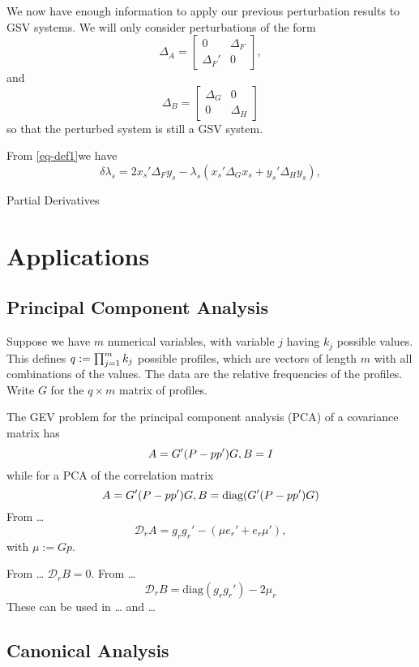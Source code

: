 \documentclass[
  12pt,
  letterpaper,
  DIV=11,
  numbers=noendperiod]{scrartcl}
\begin{document}
We now have enough information to apply our previous perturbation
results to GSV systems. We will only consider perturbations of the form
\[
\Delta_A=\begin{bmatrix}
0&\Delta_F\\
\Delta_F'&0
\end{bmatrix},
\] and \[
\Delta_B=\begin{bmatrix}
\Delta_G&0\\
0&\Delta_H
\end{bmatrix}
\] so that the perturbed system is still a GSV system.

From \eqref{eq-def1}we have \[
\delta\lambda_s=2x_s'\Delta_Fy_s-\lambda_s(x_s'\Delta_Gx_s+y_s'\Delta_Hy_s),
\]

Partial Derivatives

\section{Applications}\label{sec-applications}

\subsection{Principal Component Analysis}\label{sec-pca}

Suppose we have \(m\) numerical variables, with variable \(j\) having
\(k_j\) possible values. This defines \(q:=\smash{\prod_{j=1}^m k_j}\)
possible profiles, which are vectors of length \(m\) with all
combinations of the values. The data are the relative frequencies of the
profiles. Write \(G\) for the \(q\times m\) matrix of profiles.

The GEV problem for the principal component analysis (PCA) of a
covariance matrix has \[
A=G'(P-pp')G,\\
B=I
\] while for a PCA of the correlation matrix \[
A=G'(P-pp')G,\\
B=\text{diag}(G'(P-pp')G)
\] From \ldots{}\\
\[
\mathcal{D}_rA=g_rg_r'-(\mu e_r'+e_r\mu'),
\] with \(\mu:=Gp\).

From \ldots{} \(\mathcal{D}_rB=0\). From \ldots{} \[
\mathcal{D}_rB=\text{diag}(g_rg_r')-2\mu_r
\] These can be used in \ldots{} and \ldots{}

\subsection{Canonical Analysis}\label{sec-canonical}
\end{document}
